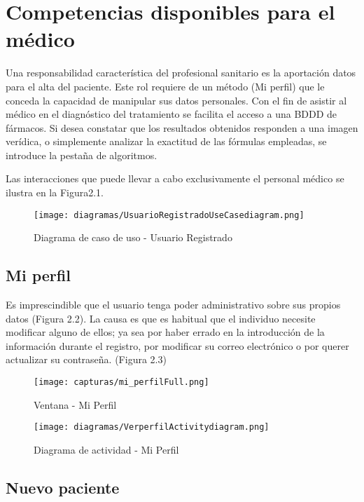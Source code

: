\documentclass[11pt,spanish,
		listoftables,listoffigures]
		{tfgplantilla}
\begin{document}
\section {Competencias disponibles para el médico}
Una responsabilidad característica del profesional sanitario es la aportación datos para el alta del paciente. Este rol requiere de un método (Mi perfil) que le conceda la capacidad de manipular sus datos personales.
Con el fin de asistir al médico en el diagnóstico del tratamiento se facilita el acceso a una BDDD de fármacos. Si desea constatar que los resultados obtenidos responden a una imagen verídica, o simplemente analizar la exactitud de las fórmulas empleadas, se introduce la pestaña de algoritmos.

Las interacciones que puede llevar a cabo exclusivamente el personal médico se ilustra en la Figura2.1.

\newpage
\begin{landscape}
	\begin{figure}[H]
	\centering
	\texttt{[image: diagramas/UsuarioRegistradoUseCasediagram.png]}
	\caption{Diagrama de caso de uso - Usuario Registrado}
	\end{figure}
\end{landscape}


\vfill
\subsection {Mi perfil}

Es imprescindible que el usuario tenga poder administrativo sobre sus propios datos (Figura 2.2). La causa es que es habitual que el individuo necesite modificar alguno de ellos; ya sea por haber errado en la introducción de la información durante el registro, por modificar su correo electrónico o por querer actualizar su contraseña. (Figura 2.3)

\begin{figure}[H]
\centering
\texttt{[image: capturas/mi\_perfilFull.png]}
\caption{Ventana - Mi Perfil}
\end{figure}

\vfill
\begin{figure}[H]
\centering
\texttt{[image: diagramas/VerperfilActivitydiagram.png]}
\caption{Diagrama de actividad -  Mi Perfil}
\end{figure}

\vfill
\subsection {Nuevo paciente}
\end{document}
